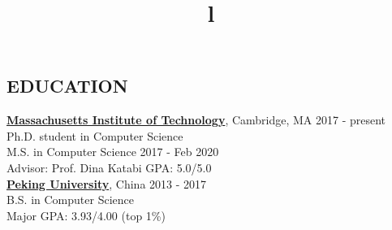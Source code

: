 \documentclass[margin]{res}
\newcommand{\Bullet}[1]{{\raisebox{0.25ex}{\tiny$\bullet$\ }}{#1}\\}
\begin{document}


\address{ \href{mailto:haohe@mit.edu}{haohe@mit.edu} $\mid$ {+1\ 617-840-0491} }


\begin{resume}

\section{EDUCATION}
\href{http://web.mit.edu}{\textbf{Massachusetts Institute of Technology}}, Cambridge, MA
\hfill 2017 - present
\\
Ph.D. student in Computer Science\\
M.S. in Computer Science \hfill {2017 - Feb 2020}
\\
\Bullet{Advisor: Prof. Dina Katabi    \qquad GPA: 5.0/5.0}
\href{http://english.pku.edu.cn/}{\textbf{Peking University}}, China
\hfill 2013 - 2017
\\
B.S. in Computer Science
\\
\Bullet{Major GPA: 3.93/4.00 (top 1\%)}
\vspace{-15mm}

\begin{format}
\title{l} \hfill {}\\
\body\\
\end{format}


\end{resume}
\end{document}
